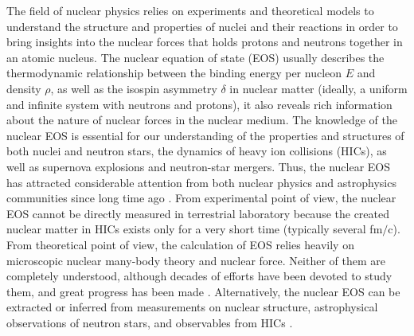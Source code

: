 \documentclass[twocolumn,aps,superscriptaddress]{revtex4}
\begin{document}
\maketitle
The field of nuclear physics relies on experiments and theoretical models to understand the structure and properties of nuclei and their reactions in order to bring insights into the nuclear
forces that holds protons and neutrons together in an atomic nucleus. The nuclear equation of state (EOS) usually describes the thermodynamic relationship between the binding energy per nucleon $E$ and density $\rho$, as
well as the isospin asymmetry $\delta$ in
nuclear matter (ideally, a uniform and infinite system with neutrons and protons), it also reveals rich information about the nature of nuclear forces in the nuclear medium. The knowledge of the nuclear EOS is essential for our understanding of the properties and structures of both nuclei and neutron stars, the dynamics of heavy ion collisions
(HICs), as well as supernova explosions and neutron-star mergers. Thus, the nuclear EOS has attracted considerable attention
from both nuclear physics and astrophysics communities
since long time ago \cite{drischler2021chiral,li2008recent,oertel2017equations,sorensen2023dense,lattimer2021neutron,Lopez:2020zne}. From experimental point of view, the nuclear EOS cannot be directly measured in terrestrial laboratory because the created nuclear matter in HICs exists only for a very short time (typically several fm$/$c). From theoretical point of view, the calculation of EOS relies heavily on microscopic nuclear many-body theory and nuclear force. Neither of them are completely understood, although decades of efforts have been devoted to study them, and great progress has been made \cite{tsang2012constraints,oertel2017equations}. Alternatively, the nuclear EOS can be extracted or inferred from measurements on nuclear structure, astrophysical observations of neutron stars, and observables from HICs \cite{WOLTER2022103962,Wang:2020vwb}.
\end{document}
